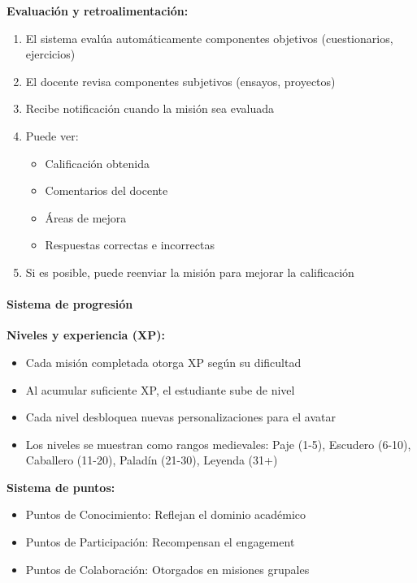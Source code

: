 \textbf{Evaluación y retroalimentación:}

\begin{enumerate}
	\item El sistema evalúa automáticamente componentes objetivos (cuestionarios, ejercicios)
	\item El docente revisa componentes subjetivos (ensayos, proyectos)
	\item Recibe notificación cuando la misión sea evaluada
	\item Puede ver:
	\begin{itemize}
		\item Calificación obtenida
		\item Comentarios del docente
		\item Áreas de mejora
		\item Respuestas correctas e incorrectas
	\end{itemize}
	\item Si es posible, puede reenviar la misión para mejorar la calificación
\end{enumerate}

\paragraph{Sistema de progresión}

\textbf{Niveles y experiencia (XP):}

\begin{itemize}
	\item Cada misión completada otorga XP según su dificultad
	\item Al acumular suficiente XP, el estudiante sube de nivel
	\item Cada nivel desbloquea nuevas personalizaciones para el avatar
	\item Los niveles se muestran como rangos medievales: Paje (1-5), Escudero (6-10), Caballero (11-20), Paladín (21-30), Leyenda (31+)
\end{itemize}

\textbf{Sistema de puntos:}

\begin{itemize}
	\item Puntos de Conocimiento: Reflejan el dominio académico
	\item Puntos de Participación: Recompensan el engagement
	\item Puntos de Colaboración: Otorgados en misiones grupales
\end{itemize}

